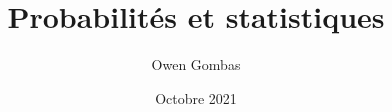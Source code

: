 \documentclass[french,a4paper,11pt]{report}
\title{Probabilités et statistiques}
\author{Owen Gombas}
\date{Octobre 2021}
\begin{document}
\maketitle
\tableofcontents{}


\end{document}
